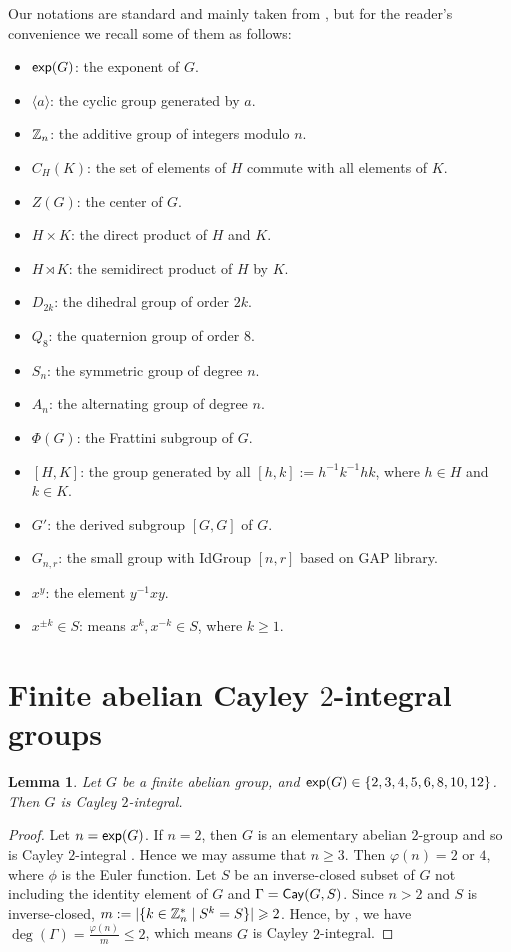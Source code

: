 \documentclass{amsart}
\newtheorem{lem}[thm]{Lemma}
\def \leq {\leqslant}
\def \geq {\geqslant}
\def\exp{{\sf exp}}
\def\Cay{{\sf Cay}} \def\Ker{{\sf Ker}}
\begin{document}
Our notations are standard and mainly taken from \cite{Robinson}, but for the reader's convenience we recall some of them as follows:
\begin{itemize}
	\item $\exp(G)$: the exponent of $G$.
	\item $\langle a\rangle$: the cyclic group generated by $a$.
	\item $\Bbb Z_n$: the additive group of integers modulo $n$.
	\item $C_H(K)$: the set of elements of $H$ commute with all elements of $K$.
	\item $Z(G)$: the center of $G$.
	\item $H\times K$: the direct product of $H$ and $K$.
	\item $H\rtimes K$: the semidirect product of $H$ by $K$.
	\item $D_{2k}$: the dihedral group of order $2k$.
	\item $Q_8$: the quaternion group of order $8$.
	\item $S_n$: the symmetric group of degree $n$.
	\item $A_n$: the alternating group of degree $n$.
	\item $\Phi(G)$: the Frattini subgroup of $G$.
	\item $[H,K]$: the group generated by all $[h,k]:=h^{-1}k^{-1}hk$, where $h\in H$ and $k\in K$.
	\item $G'$: the derived subgroup $[G,G]$ of $G$.
	\item $G_{n,r}$: the small group with IdGroup $[n,r]$ based on GAP library.
	\item $x^y$: the element $y^{-1}xy$.
	\item $x^{\pm k}\in S$: means $x^k, x^{-k}\in S$, where $k\geq 1$.
\end{itemize}



\section{Finite abelian Cayley $2$-integral groups}
\begin{lem}\label{exp}
	Let $G$ be a finite abelian group, and $\exp(G)\in\{2,3,4,5,6,8,10,12\}$. Then $G$ is Cayley $2$-integral.
\end{lem}
\begin{proof}
	Let $n=\exp(G)$. If $n=2$, then $G$ is an elementary abelian $2$-group and so is Cayley $2$-integral \cite[Theorem 4.2]{Azhvan}. Hence we may assume that $n\geq 3$. Then $\varphi(n)=2$ or $4$, where $\phi$ is the Euler function. Let $S$ be an inverse-closed subset of $G$ not including the identity element of $G$ and $\Gamma=\Cay(G,S)$. Since $n>2$ and $S$ is inverse-closed, $m:=|\{k\in\Bbb Z_n^*\mid S^k=S\}|\geq 2$. Hence, by \cite[Corollary 3.10]{WAF}, we have  $\deg(\Gamma)=\frac{\varphi(n)}{m}\leq 2$, which means $G$ is Cayley $2$-integral.
\end{proof}
\end{document}
